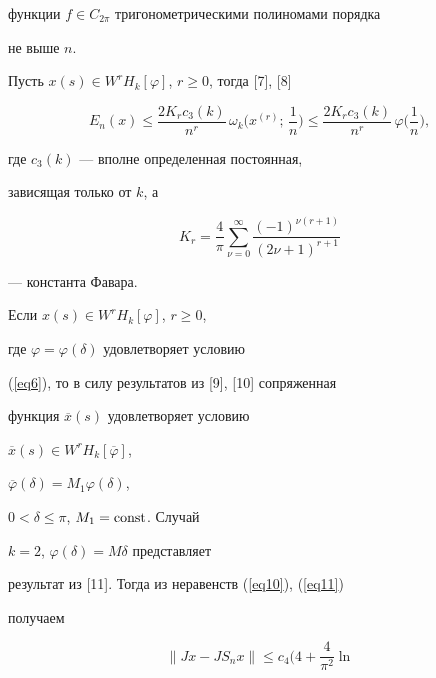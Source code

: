 \begin{pf}
функции $f\in C_{2\pi}$ тригонометрическими полиномами порядка


не выше $n$.





Пусть $x(s)\in W^rH_k[\varphi]$, $r\geq0$, тогда [7], [8]


\begin{equation}\label{eq11}


E_n(x)\leq\frac{2K_rc_3(k)}{n^r}\,\omega_k


\bigg(x^{(r)};\,\frac{1}{n}\bigg)\leq\frac{2K_rc_3(k)}{n^r}\,


\varphi\bigg(\frac{1}{n}\bigg),


\end{equation}


где $c_3(k)$ --- вполне определенная постоянная,


зависящая только от $k$, а


\begin{equation}\label{eq12}


K_r=\frac{4}{\pi}\sum_{\nu=0}^\infty\frac{(-1)^{\nu(r+1)}}{(2\nu+1)^{r+1}}


\end{equation}


--- константа Фавара.





Если $x(s)\in W^rH_k[\varphi]$, $r\geq0$,


где $\varphi=\varphi(\delta)$ удовлетворяет условию


(\ref{eq6}), то в силу результатов из [9], [10] сопряженная


функция $\overline{x}(s)$ удовлетворяет условию


$\overline{x}(s)\in


W^rH_k[\overline{\varphi}]$,


$\overline{\varphi}(\delta)=M_1\varphi(\delta)$,


$0<\delta\leq\pi$, $M_1=\operatorname{const}$. Случай


$k=2$, $\varphi(\delta)=M\delta$ представляет


результат из [11]. Тогда из неравенств (\ref{eq10}), (\ref{eq11})


получаем


\begin{equation}\label{eq13}


\|Jx-JS_nx\|\leq


c_4\bigg(4+\frac{4}{\pi^2}\ln



\end{equation}
\end{pf}
